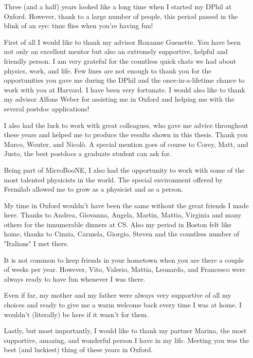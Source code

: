 Three (and a half) years looked like a long time when I started my DPhil at Oxford. However, thank to a large number of people, this period passed in the blink of an eye: time flies when you're having fun!

First of all I would like to thank my advisor Roxanne Guenette. You have been not only an excellent mentor but also an extremely supportive, helpful and friendly person. I am very grateful for the countless quick chats we had about physics, work, and life. Few lines are not enough to thank you for the opportunities you gave me during the DPhil and the once-in-a-lifetime chance to work with you at Harvard. I have been very fortunate. I would also like to thank my advisor Alfons Weber for assisting me in Oxford and helping me with the several postdoc applications!

I also had the luck to work with great colleagues, who gave me advice throughout these years and helped me to produce the results shown in this thesis. Thank you Marco, Wouter, and Nicolò. A special mention goes of course to Corey, Matt, and Justo, the best postdocs a graduate student can ask for.

Being part of MicroBooNE, I also had the opportunity to work with some of the most talented physicists in the world. The special environment offered by Fermilab allowed me to grow as a physicist and as a person.

My time in Oxford wouldn't have been the same without the great friends I made here. Thanks to Andrea, Giovanna, Angela, Martin, Mattia, Virginia and many others for the innumerable dinners at CS.
Also my period in Boston felt like home, thanks to Cinzia, Carmela, Giorgio, Steven and the countless number of "Italians" I met there. 

It is not common to keep friends in your hometown when you are there a couple of weeks per year. However, Vito, Valerio, Mattia, Leonardo, and Francesco were always ready to have fun whenever I was there.

Even if far, my mother and my father were always very supportive of all my choices and ready to give me a warm welcome back every time I was at home. I wouldn't (literally) be here if it wasn't for them.

Lastly, but most importantly, I would like to thank my partner Marina, the most supportive, amazing, and wonderful person I have in my life. Meeting you was the best (and luckiest) thing of these years in Oxford.
